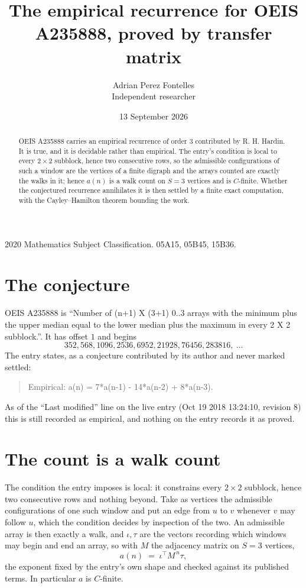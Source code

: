 \documentclass[11pt,a4paper]{article}
\title{The empirical recurrence for OEIS A235888, proved by transfer matrix}
\author{Adrian Perez Fontelles\\ \small Independent researcher}
\date{13 September 2026}
\theoremstyle{plain}
\theoremstyle{definition}
\begin{document}
\maketitle

\begin{abstract}
OEIS A235888 carries an empirical recurrence of order $3$ contributed by R. H. Hardin. It is
true, and it is decidable rather than empirical. The entry's condition is local to every $2\times2$ subblock, hence two consecutive rows, so
the admissible configurations of such a window are the vertices of a finite digraph and the
arrays counted are exactly the walks in it; hence $a(n)$ is a walk count on $S=3$ vertices
and is $C$-finite. Whether the conjectured recurrence annihilates it is then settled by a
finite exact computation, with the Cayley--Hamilton theorem bounding the work.
\end{abstract}

\noindent\small 2020 Mathematics Subject Classification. 05A15, 05B45, 15B36.\normalsize

\section{The conjecture}

OEIS A235888 is ``Number of (n+1) X (3+1) 0..3 arrays with the minimum plus the upper median equal to the lower median plus the maximum in every 2 X 2 subblock.''. It has offset $1$ and begins
\[
352, 568, 1096, 2536, 6952, 21928, 76456, 283816,\ \dots
\]
The entry states, as a conjecture contributed by its author and never marked settled:
\begin{quote}
Empirical: a(n) = 7*a(n-1) - 14*a(n-2) + 8*a(n-3).
\end{quote}
As of the ``Last modified'' line on the live entry (Oct 19 2018 13:24:10, revision 8) this is still
recorded as empirical, and nothing on the entry records it as proved.

\section{The count is a walk count}

The condition the entry imposes is local: it constrains every $2\times2$ subblock, hence two consecutive rows and nothing beyond. Take as vertices the admissible configurations of one such window and put an edge from $u$ to $v$ whenever $v$ may follow $u$, which the condition decides by inspection of the two.
An admissible array is then exactly a walk, and $\iota,\tau$ are the vectors recording which windows may begin and end an array, so with $M$ the adjacency matrix on $S=3$ vertices,
\[
a(n)\;=\;\iota^{\!\top}M^{\,n}\tau ,
\]
the exponent fixed by the entry's own shape and checked against its published terms. In
particular $a$ is $C$-finite.
\end{document}
